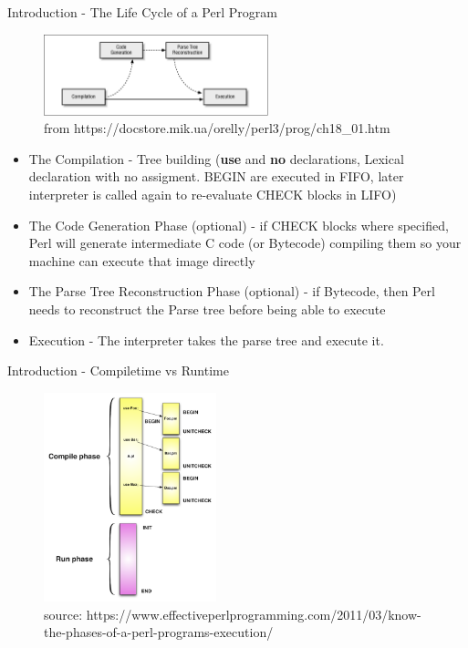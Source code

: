 \documentclass[10pt]{beamer}
\begin{document}
\begin{frame}[fragile]{Introduction - The Life Cycle of a Perl Program}
\begin{figure}
    \centering
    \includegraphics[width=6.5cm]{images/perl3_1801.png}
    \caption{from https://docstore.mik.ua/orelly/perl3/prog/ch18\_01.htm}
\end{figure}
\vspace{-0.4cm}
\begin{itemize}
\item  The Compilation - Tree building (\textbf{use} and \textbf{no} declarations, Lexical declaration with no assigment. BEGIN are executed in FIFO, later interpreter is called again to re-evaluate CHECK blocks in LIFO)
\item   The Code Generation Phase (optional) - if CHECK blocks where specified, Perl will generate intermediate C code (or Bytecode) compiling them so your machine can execute that image directly
\item  The Parse Tree Reconstruction Phase (optional) - if Bytecode, then Perl needs to reconstruct the Parse tree before being able to execute
\item Execution - The interpreter takes the parse tree and execute it.

\end{itemize}
\end{frame}


\begin{frame}[fragile]{Introduction - Compiletime vs Runtime}
\begin{figure}
    \centering
    \includegraphics[width=5cm]{images/phases.png}
    \caption{source: https://www.effectiveperlprogramming.com/2011/03/know-the-phases-of-a-perl-programs-execution/}
\end{figure}

\end{frame}
\end{document}
